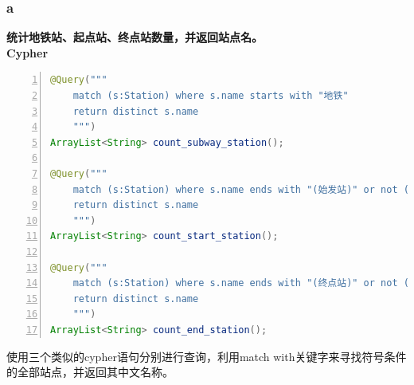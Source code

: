 \documentclass[11pt,a4paper]{article}
\begin{document}
\subsubsection{a}
\textbf{统计地铁站、起点站、终点站数量，并返回站点名。} \\
\textbf{Cypher} \\
\begin{lstlisting}[numbers = left, 
showstringspaces=false,
showspaces = false,
breaklines = true, 
language=Java]
@Query("""
	match (s:Station) where s.name starts with "地铁"
	return distinct s.name
	""")
ArrayList<String> count_subway_station();

@Query("""
	match (s:Station) where s.name ends with "(始发站)" or not () --> (s)
	return distinct s.name
	""")
ArrayList<String> count_start_station();

@Query("""
	match (s:Station) where s.name ends with "(终点站)" or not (s) --> ()
	return distinct s.name
	""")
ArrayList<String> count_end_station();
\end{lstlisting} 
使用三个类似的cypher语句分别进行查询，利用match with关键字来寻找符号条件的全部站点，并返回其中文名称。
\end{document}
